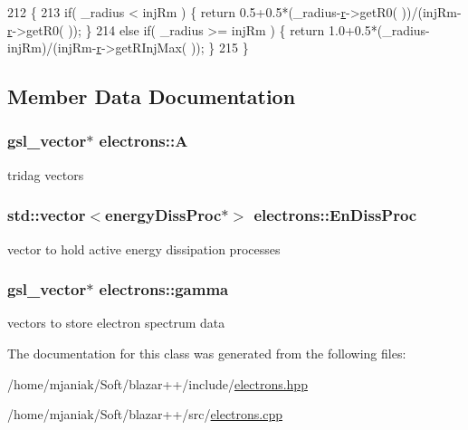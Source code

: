 \begin{DoxyCode}
212                                       \{
213   \textcolor{keywordflow}{if}( \_radius < injRm ) \{ \textcolor{keywordflow}{return} 0.5+0.5*(\_radius-\hyperlink{classbaseClass_a482bb9b1d94f3eb3f31026d14e9a2bb6}{r}->getR0( ))/(injRm-\hyperlink{classbaseClass_a482bb9b1d94f3eb3f31026d14e9a2bb6}{r}->getR0( )); \}
214   \textcolor{keywordflow}{else} \textcolor{keywordflow}{if}( \_radius >= injRm ) \{ \textcolor{keywordflow}{return} 1.0+0.5*(\_radius-injRm)/(injRm-\hyperlink{classbaseClass_a482bb9b1d94f3eb3f31026d14e9a2bb6}{r}->getRInjMax( )); \}
215 \}
\end{DoxyCode}


\subsection{Member Data Documentation}
\hypertarget{classelectrons_a5d1c72cf1ee40f0e918fbb2d9d13393b}{
\subsubsection[{A}]{\setlength{\rightskip}{0pt plus 5cm}gsl\-\_\-vector$\ast$ electrons\-::\-A}}\label{classelectrons_a5d1c72cf1ee40f0e918fbb2d9d13393b}
tridag vectors \hypertarget{classelectrons_a2c90bebdf0a961a720dc9b70306fb6ea}{
\subsubsection[{En\-Diss\-Proc}]{\setlength{\rightskip}{0pt plus 5cm}std\-::vector$<${\bf energy\-Diss\-Proc}$\ast$$>$ electrons\-::\-En\-Diss\-Proc}}\label{classelectrons_a2c90bebdf0a961a720dc9b70306fb6ea}
vector to hold active energy dissipation processes \hypertarget{classelectrons_aba72b6575be27358efcb13cc3415df68}{
\subsubsection[{gamma}]{\setlength{\rightskip}{0pt plus 5cm}gsl\-\_\-vector$\ast$ electrons\-::gamma}}\label{classelectrons_aba72b6575be27358efcb13cc3415df68}
vectors to store electron spectrum data 

The documentation for this class was generated from the following files\-:\begin{DoxyCompactItemize}
\item 
/home/mjaniak/\-Soft/blazar++/include/\hyperlink{electrons_8hpp}{electrons.\-hpp}\item 
/home/mjaniak/\-Soft/blazar++/src/\hyperlink{electrons_8cpp}{electrons.\-cpp}\end{DoxyCompactItemize}
